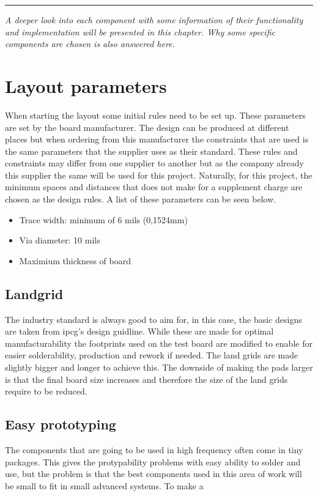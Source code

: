 
\vspace{-10ex}%
\rule{\textwidth}{0.3pt}
\vspace{5ex}

\textit{
A deeper look into each component with some information of their functionality and implementation will be presented in this chapter. Why some specific components are chosen is also answered here. 
}
\vspace{5ex}



\section{Layout parameters}

When starting the layout some initial rules need to be set up. These parameters are set by the board manufacturer.
The design can be produced at different places but when ordering from this manufacturer the constraints that are used is the same parameters that the supplier uses as their standard.
These rules and constraints may differ from one supplier to another but as the company already this supplier the same will be used for this project.
Naturally, for this project, the minimum spaces and distances that does not make for a supplement charge are chosen as the design rules. A list of these parameters can be seen below.

\begin{itemize}
\item Trace width: minimum of 6 mils (0,1524mm) 
\item Via diameter: 10 mils
\item Maximium thickness of board

\end{itemize}
 
\subsection{Landgrid}
The industry standard is always good to aim for, in this case, the basic designs are taken from \gls{ipcg}'s design guidline\cite{ipcg}. While these are made for optimal manufacturability the footprints used on the test board are modified to enable for easier solderability, production and rework if needed. The land grids are made slightly bigger and longer to achieve this. The downside of making the pads larger is that the final board size increases and therefore the size of the land grids require to be reduced.

\subsection{Easy prototyping}
The components that are going to be used in high frequency often come in tiny packages. This gives the protypability problems with easy ability to solder and use, but the problem is that the best components used in this area of work will be small to fit in small advanced systems. To make a


